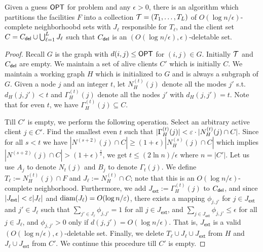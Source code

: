 \begin{theorem}\label{thm:weakdecomp}
	Given a guess $\mathsf{OPT}$ for \mckc problem and any $\epsilon>0$,  there is an algorithm which partitions the facilities $F$ into a collection ${\cal T} = (T_1,\ldots,T_L)$ of 
	$O(\log n/\epsilon)$-complete neighborhoobd sets with $J_\ell$ responsible for $T_\ell$, and the client set $C = C_{\mathsf{del}} \cup \bigcup_{\ell=1}^L J_\ell$ such that
	$C_{\mathsf{del}}$ is an $(O(\log n/\epsilon),\epsilon)$-deletable set.
\end{theorem}
\begin{proof}
Recall $G$ is the graph with $d(i,j) \leq \mathsf{OPT}$ for $(i,j)\in G$. %
	Initially ${\cal T}$ and $C_{\mathsf{del}}$ are empty. We maintain a set of alive clients $C'$ which is initially $C$. We maintain a working graph $H$ which is initialized to $G$ and is always a subgraph of $G$.
	Given a node $j$ and an integer $t$, let $N^{(t)}_H(j)$ denote all the modes $j'$ s.t. $d_H(j,j') < t$ and $\Gamma^{(t)}_H(j)$ denote all the nodes $j'$ with $d_H(j,j')  = t$.
	Note that for even $t$, we have $\Gamma^{(t)}_H(j) \subseteq C$.
	\smallskip
	
	
	Till $C'$ is empty, we perform the following operation.
	Select an arbitrary active client $j\in C'$. Find the smallest even $t$ such that $|\Gamma^{(t)}_H(j)| < \varepsilon\cdot |N^{(t)}_H(j)\cap C|$. Since for all $s < t$ we have $|N^{(s+2)}(j)\cap C|\geq (1+\epsilon)|N^{(s)}_H(j)\cap C|$ which implies $|N^{(s+2)}(j)\cap C| > (1+\epsilon)^{\frac{s}{2}}$, 
	we get  $t \leq (2\ln n)/\epsilon$ where $n=|C'|$. Let us use $A_j$ to denote $N_t(j)$ and $B_j$ to denote $\Gamma_{t}(j)$. 
	We define $T_\ell := N^{(t)}_H(j) \cap F$ and $J_\ell := N^{(t)}_H \cap C$; note that this is an $O(\log n/\epsilon)$-complete neighborhood. Furthermore, we add $J_\mathsf{ext} := \Gamma^{(t)}_H(j)$ to $C_{\mathsf{del}}$, and since
	$|J_\mathsf{ext}| < \varepsilon |J_\ell|$ and $\mathrm{diam}(J_\ell) = O(\log n/\varepsilon)$, there exists a mapping $\phi_{j,j'}$ for $j\in J_\mathsf{ext}$ and $j'\in J_\ell$ such that $\sum_{j'\in J_\ell} \phi_{j,j'} = 1$ for all $j\in J_\mathsf{ext}$, and 
	$\sum_{j\in J_\mathsf{ext}} \phi_{j,j'} \leq \epsilon$ for all $j\in J_\ell$, and $\phi_{j,j'} > 0$ only if $d(j,j') = O(\log n/\epsilon)$. That is, $J_\mathsf{ext}$ is a valid $(O(\log n/\epsilon),\epsilon)$-deletable set.
	Finally, we delete $T_\ell \cup J_\ell \cup J_\mathsf{ext}$ from $H$ and $J_\ell \cup J_\mathsf{ext}$ from $C'$. We continue this procedure till $C'$ is empty. \end{proof}
